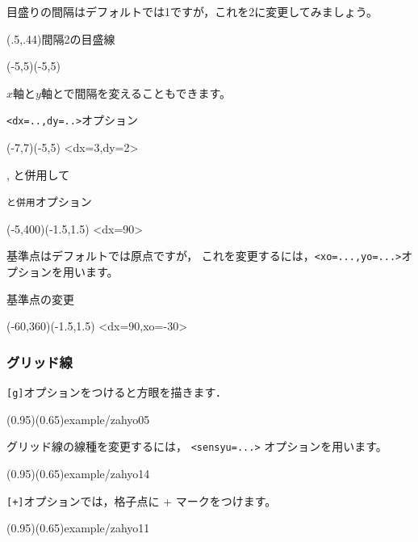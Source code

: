 目盛りの間隔はデフォルトでは1ですが，これを2に変更してみましょう。

\begin{showEx}(.5,.44){間隔2の目盛線}
\small
\begin{zahyou}[ul=4mm](-5,5)(-5,5)
\end{zahyou}
\end{showEx}

$x$軸と$y$軸とで間隔を変えることもできます。

\begin{showEx}{\texttt{<dx=..,dy=..>}オプション}
\small
\begin{zahyou}%
  [ul=3mm](-7,7)(-5,5)
\zahyouMemori<dx=3,dy=2>
\end{zahyou}
\end{showEx}

,  と併用して

\begin{showEx}{\texttt{と併用}オプション}
\small
\begin{zahyou}%
  [ul=8mm,yokozikuhaiti={[n]},%
    xscale=0.017453]%
  (-5,400)(-1.5,1.5)
\zahyouMemori<dx=90>
\end{zahyou}
\end{showEx}

基準点はデフォルトでは原点ですが，
これを変更するには，\verb+<xo=...,yo=...>+オプションを用います。

\begin{showEx}{基準点の変更}
\small
\begin{zahyou}%
  [ul=8mm,%
    yokozikuhaiti={[n]},%
    gentenhaiti={[se]},%
    xscale=0.017453]%
  (-60,360)(-1.5,1.5)
\zahyouMemori<dx=90,xo=-30>
\end{zahyou}
\end{showEx}

\subsubsection{グリッド線}
\texttt{[g]}オプションをつけると方眼を描きます．

\showexample[方眼 \& 目盛り](0.95)(0.65){example/zahyo05}

グリッド線の線種を変更するには，
\verb+<sensyu=...>+ オプションを用います。

\showexample[線種の変更](0.95)(0.65){example/zahyo14}

\texttt{[+]}オプションでは，格子点に + マークをつけます。

\showexample[格子点に + ](0.95)(0.65){example/zahyo11}

